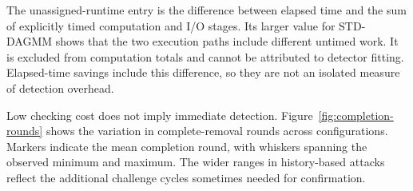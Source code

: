 \documentclass[conference]{IEEEtran}
\begin{document}
The unassigned-runtime entry is the difference between elapsed time and
the sum of explicitly timed computation and I/O stages. Its larger value
for STD-DAGMM shows that the two execution paths include different
untimed work. It is excluded from computation totals and cannot be
attributed to detector fitting. Elapsed-time savings include this
difference, so they are not an isolated measure of detection overhead.

Low checking cost does not imply immediate detection.
Figure~\ref{fig:completion-rounds} shows the variation in complete-removal
rounds across configurations. Markers indicate the mean completion round,
with whiskers spanning the observed minimum and maximum.
The wider ranges in history-based attacks
reflect the additional challenge cycles sometimes needed for confirmation.
\end{document}
